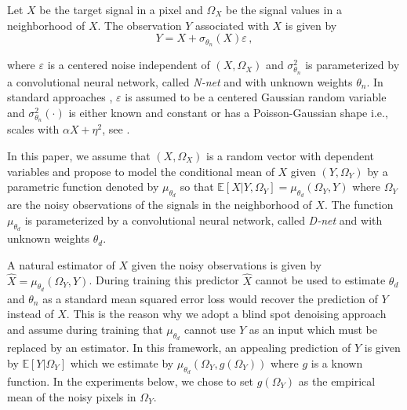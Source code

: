 \documentclass{article}
\begin{document}
Let $X$ be the target signal in a pixel and $\Omega_X$ be the signal values in a neighborhood of $X$.  The observation $Y$ associated with $X$  is given by
\begin{equation}
\label{eq:def:Y}
Y = X + \sigma_{\theta_n}(X)\varepsilon\,,
\end{equation}

where $\varepsilon$ is a centered noise independent of $(X,\Omega_X)$ and $\sigma^2_{\theta_n}$ is parameterized by a convolutional neural network, called \textit{N-net} and with unknown weights $\theta_n$. In standard approaches \cite{},  $\varepsilon$ is assumed to be a centered Gaussian random variable and  $\sigma^2_{\theta_n}(\cdot)$ is either known and constant \cite{} or has a Poisson-Gaussian shape i.e., scales with $\alpha X + \eta^2$, see \cite{}.

In this paper, we assume that $(X,\Omega_X)$ is a random vector with dependent variables and propose to model the conditional mean of $X$ given $(Y,\Omega_Y)$ by a parametric function denoted by $\mu_{\theta_d}$ so that $\mathbb{E}[X|Y,\Omega_Y] = \mu_{\theta_d}(\Omega_Y,Y)$ where $\Omega_Y$ are the noisy observations of the signals in the neighborhood of $X$. The function $ \mu_{\theta_d}$ is parameterized by a convolutional neural network, called \textit{D-net} and with unknown weights $\theta_d$.

A natural estimator of $X$ given the noisy observations is given by $\widehat X = \mu_{\theta_d}(\Omega_Y,Y)$. During training this predictor $\widehat X$ cannot be used to estimate $\theta_d$ and $\theta_n$ as  a standard mean squared error loss would recover the prediction of $Y$ instead of $X$. This is the reason why we adopt a blind spot denoising approach and assume during training that $\mu_{\theta_d}$ cannot use $Y$ as an input which must be replaced by an estimator. In this framework, an appealing prediction of $Y$ is given by $\mathbb{E}[Y|\Omega_Y]$ which we estimate by $\mu_{\theta_d}(\Omega_Y,g(\Omega_Y))$ where $g$ is a known function. In the experiments below, we chose to set $g(\Omega_Y)$ as the empirical mean of the noisy pixels in $\Omega_Y$.
\end{document}
